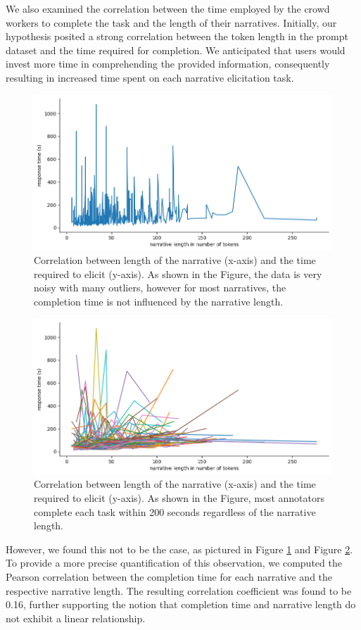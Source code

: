 We also examined the correlation between the time employed by the crowd workers to complete the task and the length of their narratives. Initially, our hypothesis posited a strong correlation between the token length in the prompt dataset and the time required for completion. We anticipated that users would invest more time in comprehending the provided information, consequently resulting in increased time spent on each narrative elicitation task.
\begin{figure}[!htbp]
    \centering
    \includegraphics[width=1\linewidth]{assets//imgs/dataset-pearson-correlation.png}
    \caption{Correlation between length of the narrative (x-axis) and the time required to elicit (y-axis). As shown in the Figure, the data is very noisy with many outliers, however for most narratives, the completion time is not influenced by the narrative length.}
    \label{fig:dataset-pearson-correlation}
\end{figure}
\begin{figure}[!htbp]
    \centering
        \includegraphics[width=1\linewidth]{assets//imgs/dataset-overall-correlation-workers.png}
        \caption{Correlation between length of the narrative (x-axis) and the time required to elicit (y-axis). As shown in the Figure, most annotators complete each  task within 200 seconds regardless of the narrative length.}
        \label{fig:dataset-overall-correlation-workers}
\end{figure}
However, we found this not to be the case, as pictured in Figure \ref{fig:dataset-pearson-correlation} and Figure \ref{fig:dataset-overall-correlation-workers}. To provide a more precise quantification of this observation, we computed the Pearson correlation between the completion time for each narrative and the respective narrative length. The resulting correlation coefficient was found to be 0.16, further supporting the notion that completion time and narrative length do not exhibit a linear relationship.

